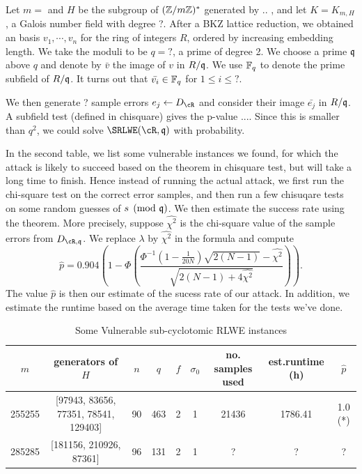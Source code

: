 \documentclass{amsart}
\begin{document}
\begin{Example}
Let $m = $ and $H$ be the subgroup of $(\mathbb{Z}/m\mathbb{Z})^*$ generated by .. , and let $K = K_{m,H}$, a Galois number field with degree ?. After a BKZ lattice reduction, we obtained an basis $v_1, \cdots, v_n$ for the ring of integers $R$, ordered by increasing embedding length. We take the moduli to be $q = ?$, a prime of degree 2. We choose a prime $\mathfrak{q}$ above $q$ and denote by $\bar{v}$ the image of $v$ in $R/\mathfrak{q}$. We use $\mathbb{F}_q$ to denote the prime subfield of $R/\mathfrak{q}$. It turns out that $\bar{v_i} \in \mathbb{F}_q$ for $1 \leq i \leq ?$.

We then generate ? sample errors $e_j \gets D_{\cR}$ and consider their image $\bar{e_j}$ in $R/\mathfrak{q}$. A subfield test (defined in chisquare) gives the p-value .... Since this is smaller than $q^2$, we could solve $\SRLWE(\cR,\fq)$ with probability.
\end{Example}




In the second table, we list some vulnerable instances we found, for which the attack is likely to succeed based on
the theorem in chisquare test, but will take a long time to finish. Hence instead of running the actual attack, we first run the chi-square test on the correct error samples, and then run a few chisuqare tests on some random guesses of $s \pmod{\mathfrak{q}}$. We then estimate the success rate using the theorem. More precisely, suppose $\hat{\chi^2}$ is the chi-square value of the sample errors from $D_{\cR, \fq}$. We replace $\lambda$ by $\hat{\chi^2}$ in the formula and compute
\[
    \hat{p}  = 0.904 \left(1 - \Phi \left(\frac{\Phi^{-1}(1- \frac{1}{20N})\sqrt{2(N-1)}- \hat{\chi^2}}{\sqrt{2(N-1) +4\hat{\chi^2}}}\right)\right).
\]
The value $\hat{p}$ is then our estimate of the sucess rate of our attack.  In addition, we estimate the runtime based on the average time taken for the tests we've done.

\begin{table}
\caption{Some Vulnerable sub-cyclotomic RLWE instances}
\begin{tabular}{c|c|c|c|c|c|c|c|c}
$m$ & generators of $H$ & $n$ & $q$ & $f$ & $\sigma_0$ & no. samples used & est.runtime (h) & $\hat{p}$ \\ \hline
255255 & [97943, 83656, 77351, 78541, 129403] & 90 & 463 & 2 & 1 & 21436 & 1786.41 & 1.0 (*) \\
285285 & [181156, 210926, 87361] & 96 & 131 & 2 & 1 & ? & ? & ?
\end{tabular}
\end{table}
\end{document}
